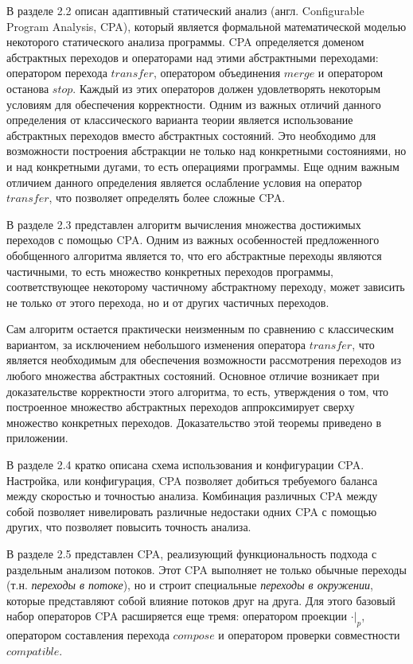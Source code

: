В разделе 2.2 описан адаптивный статический анализ (англ. Configurable Program Analysis, CPA), который является формальной математической моделью некоторого статического анализа программы.
CPA определяется доменом абстрактных переходов и операторами над этими абстрактными переходами: оператором перехода $transfer$, оператором объединения $merge$ и оператором останова $stop$.
Каждый из этих операторов должен удовлетворять некоторым условиям для обеспечения корректности.
Одним из важных отличий данного определения от классического варианта теории является использование абстрактных переходов вместо абстрактных состояний.
Это необходимо для возможности построения абстракции не только над конкретными состояниями, но и над конкретными дугами, то есть операциями программы.
Еще одним важным отличием данного определения является ослабление условия на оператор $transfer$, что позволяет определять более сложные CPA.

В разделе 2.3 представлен алгоритм вычисления множества достижимых переходов с помощью CPA.
Одним из важных особенностей предложенного обобщенного алгоритма является то, что его абстрактные переходы являются частичными, то есть множество конкретных переходов программы, соответствующее некоторому частичному абстрактному переходу, может зависить не только от этого перехода, но и от других частичных переходов. 

Сам алгоритм остается практически неизменным по сравнению с классическим вариантом, за исключением небольшого изменения оператора $transfer$, что является необходимым для обеспечения возможности рассмотрения переходов из любого множества абстрактных состояний. 
Основное отличие возникает при доказательстве корректности этого алгоритма, то есть, утверждения о том, что построенное множество абстрактных переходов аппроксимирует сверху множество конкретных переходов.
Доказательство этой теоремы приведено в приложении.

В разделе 2.4 кратко описана схема использования и конфигурации CPA. 
Настройка, или конфигурация, CPA позволяет добиться требуемого баланса между скоростью и точностью анализа. 
Комбинация различных CPA между собой позволяет нивелировать различные недостаки одних CPA с помощью других, что позволяет повысить точность анализа.
 
В разделе 2.5 представлен CPA, реализующий функциональность подхода с раздельным анализом потоков.
Этот CPA выполняет не только обычные переходы (т.н. \textit{переходы в потоке}), но и строит специальные \textit{переходы в окружении}, которые представляют собой влияние потоков друг на друга.
Для этого базовый набор операторов CPA расширяется еще тремя: оператором проекции $\cdot|_p$, оператором составления перехода $compose$ и оператором проверки совместности $compatible$.

